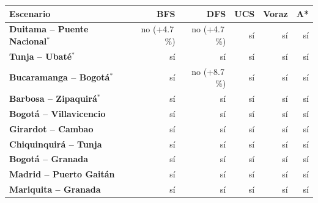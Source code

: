 \renewcommand{\arraystretch}{1.2}
\begin{tabular}{|l|r|r|r|r|r|}
\hline
\rowcolor{gray!20} \textbf{Escenario} & \textbf{BFS} & \textbf{DFS} & \textbf{UCS} & \textbf{Voraz} & \textbf{A*} \\
\hline
\textbf{Duitama -- Puente Nacional$^{*}$} & no (+4.7\,\%) & no (+4.7\,\%) & sí & sí & sí \\
\hline
\textbf{Tunja -- Ubaté$^{*}$} & sí & sí & sí & sí & sí \\
\hline
\textbf{Bucaramanga -- Bogotá$^{*}$} & sí & no (+8.7\,\%) & sí & sí & sí \\
\hline
\textbf{Barbosa -- Zipaquirá$^{*}$} & sí & sí & sí & sí & sí \\
\hline
\textbf{Bogotá -- Villavicencio} & sí & sí & sí & sí & sí \\
\hline
\textbf{Girardot -- Cambao} & sí & sí & sí & sí & sí \\
\hline
\textbf{Chiquinquirá -- Tunja} & sí & sí & sí & sí & sí \\
\hline
\textbf{Bogotá -- Granada} & sí & sí & sí & sí & sí \\
\hline
\textbf{Madrid -- Puerto Gaitán} & sí & sí & sí & sí & sí \\
\hline
\textbf{Mariquita -- Granada} & sí & sí & sí & sí & sí \\
\hline
\end{tabular}
